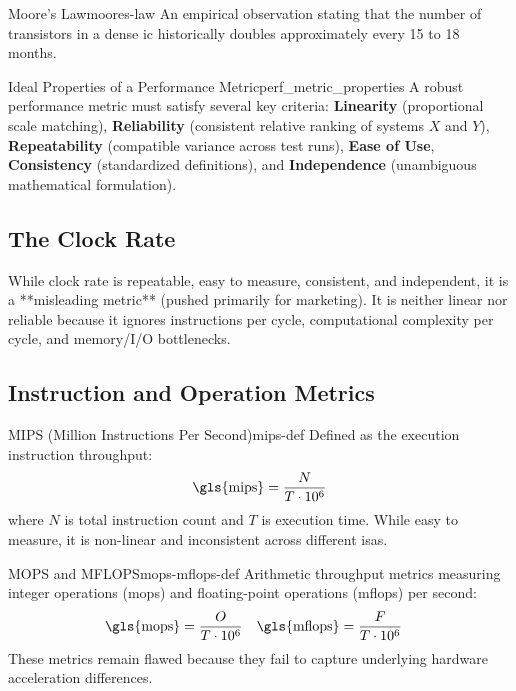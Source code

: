 \begin{concept}{Moore's Law}{moores-law}
    An empirical observation stating that the number of transistors in a dense \gls{ic} historically doubles approximately every 15 to 18 months.
\end{concept}

\begin{definition}{Ideal Properties of a Performance Metric}{perf_metric_properties}
    A robust performance metric must satisfy several key criteria: \textbf{Linearity} (proportional scale matching), \textbf{Reliability} (consistent relative ranking of systems \(X\) and \(Y\)), \textbf{Repeatability} (compatible variance across test runs), \textbf{Ease of Use}, \textbf{Consistency} (standardized definitions), and \textbf{Independence} (unambiguous mathematical formulation).
\end{definition}

\subsection{The Clock Rate}
While clock rate is repeatable, easy to measure, consistent, and independent, it is a **misleading metric** (pushed primarily for marketing). It is neither linear nor reliable because it ignores instructions per cycle, computational complexity per cycle, and memory/I/O bottlenecks.

\subsection{Instruction and Operation Metrics}
\begin{definition}{MIPS (Million Instructions Per Second)}{mips-def}
    Defined as the execution instruction throughput:
    \[
        \text{\gls{mips}} = \frac{N}{T \cdot 10^6}
    \]
    where \(N\) is total instruction count and \(T\) is execution time. While easy to measure, it is non-linear and inconsistent across different \glspl{isa}.
\end{definition}

\begin{definition}{MOPS and MFLOPS}{mops-mflops-def}
    Arithmetic throughput metrics measuring integer operations (\gls{mops}) and floating-point operations (\gls{mflops}) per second:
    \begin{align*}
        \text{\gls{mops}} &= \frac{O}{T \cdot 10^6} & \text{\gls{mflops}} &= \frac{F}{T \cdot 10^6}
    \end{align*}
    These metrics remain flawed because they fail to capture underlying hardware acceleration differences.
\end{definition}


